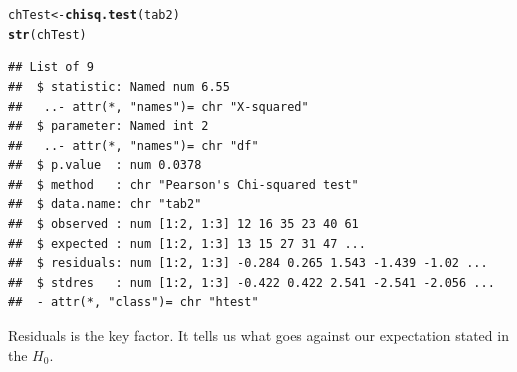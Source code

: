 \documentclass[12pt]{beamer}\usepackage[]{graphicx}\usepackage[]{color}
\makeatletter
\newcommand{\hlstr}[1]{\textcolor[rgb]{0.192,0.494,0.8}{#1}}%
\newcommand{\hlopt}[1]{\textcolor[rgb]{0,0,0}{#1}}%
\newcommand{\hlstd}[1]{\textcolor[rgb]{0.345,0.345,0.345}{#1}}%
\newcommand{\hlkwb}[1]{\textcolor[rgb]{0.69,0.353,0.396}{#1}}%
\newcommand{\hlkwd}[1]{\textcolor[rgb]{0.737,0.353,0.396}{\textbf{#1}}}%
\newenvironment{kframe}{%
 \def\at@end@of@kframe{}%
 \ifinner\ifhmode%
  \def\at@end@of@kframe{\end{minipage}}%
  \begin{minipage}{\columnwidth}%
 \fi\fi%
 \def\FrameCommand##1{\hskip\@totalleftmargin \hskip-\fboxsep
 \colorbox{shadecolor}{##1}\hskip-\fboxsep
     \hskip-\linewidth \hskip-\@totalleftmargin \hskip\columnwidth}%
 \MakeFramed {\advance\hsize-\width
   \@totalleftmargin\z@ \linewidth\hsize
   \@setminipage}}%
 {\par\unskip\endMakeFramed%
 \at@end@of@kframe}
\newenvironment{knitrout}{}{} %
\makeatother
\begin{document}

\begin{frame}[fragile]

\begin{knitrout}\small
{}\color{fgcolor}\begin{kframe}
\begin{alltt}
\hlstd{chTest} \hlkwb{<-} \hlkwd{chisq.test}\hlstd{(tab2)}
\hlkwd{str}\hlstd{(chTest)}
\end{alltt}
\begin{verbatim}
## List of 9
##  $ statistic: Named num 6.55
##   ..- attr(*, "names")= chr "X-squared"
##  $ parameter: Named int 2
##   ..- attr(*, "names")= chr "df"
##  $ p.value  : num 0.0378
##  $ method   : chr "Pearson's Chi-squared test"
##  $ data.name: chr "tab2"
##  $ observed : num [1:2, 1:3] 12 16 35 23 40 61
##  $ expected : num [1:2, 1:3] 13 15 27 31 47 ...
##  $ residuals: num [1:2, 1:3] -0.284 0.265 1.543 -1.439 -1.02 ...
##  $ stdres   : num [1:2, 1:3] -0.422 0.422 2.541 -2.541 -2.056 ...
##  - attr(*, "class")= chr "htest"
\end{verbatim}
\end{kframe}
\end{knitrout}

Residuals is the key factor. It tells us what goes against our expectation stated in the $H_0$. 

\end{frame}


\end{document}
